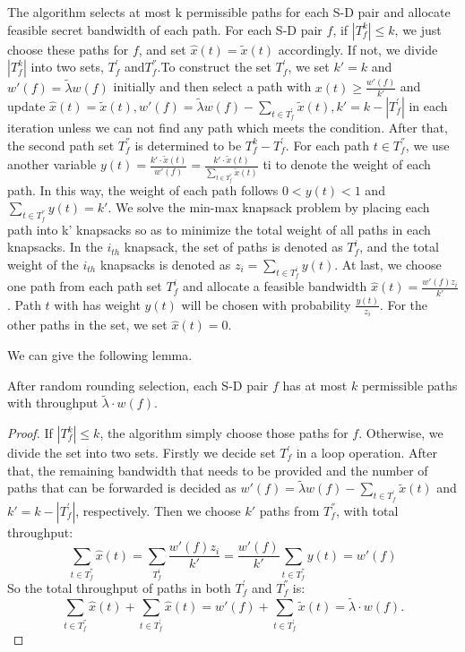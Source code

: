 {The algorithm selects at most k permissible paths  for each S-D pair and allocate feasible secret bandwidth of each path. For each S-D pair $f$, if $|T^k_f| \le k$, we just choose these paths for $f$, and set $\hat{x}(t) = \widetilde{x}(t)$ accordingly. If not, we divide $|T^k_f|$ into two sets, $T^{'}_{f}$ and$ T^{''}_{f}$.To construct the set  $T^{'}_{f}$, we set $k' = k$ and $w'(f) = \widetilde{\lambda}w(f)$ initially and then select a path with $x(t) \ge \frac{w'(f)}{k'}$ and update $\hat{x}(t) = \widetilde{x}(t), w'(f) = \widetilde{\lambda}w(f) - \sum_{t \in T^{'}_f} \widetilde{x}(t), k' = k - |T^{'}_f|$ in each iteration unless we can not find any path which meets the condition. After that, the second path set $T^{''}_{f}$ is determined to be $T^k_f - T^{'}_f$. For each path $t \in T^{''}_{f}$, we use another variable $y(t) = \frac{k' \cdot \widetilde{x}(t)}{w'(f)} = \frac{k' \cdot \widetilde{x}(t)}{\sum_{t \in T^{''}_f} \widetilde{x}(t)}$ ti to denote the weight of each path. In this way, the weight of each path  follows $0 < y(t) < 1$ and $\sum_{t \in T^{''}_f}y(t) = k'$. We solve the min-max knapsack problem by placing each path into k' knapsacks so as to minimize the total weight of all paths in each knapsacks. In the $i_{th}$ knapsack, the set of paths is denoted as $T^i_f$, and the total weight of the $i_{th}$ knapsacks is denoted as $z_i = \sum_{t \in T^i_f}y(t)$. At last, we choose one path from each path set $T^i_f$ and allocate a feasible bandwidth $\hat{x}(t) = \frac{w'(f)z_i}{k'}$. Path $t$ with has weight $y(t)$ will be chosen with probability $\frac{y(t)}{z_i}$. For the other paths in the set, we set $\hat{x}(t) = 0$.

We can give the following lemma.
\begin{lemma}
	After random rounding selection, each S-D pair $f$ has at most $k$ permissible paths with throughput $\widetilde{\lambda} \cdot w(f)$.
	
	\begin{proof}
		If $|T^k_f| \le k$, the algorithm simply choose those paths for $f$. Otherwise, we divide the set into two sets. Firstly we decide set $T^{'}_f$ in a loop operation. After that, the remaining bandwidth that needs to be provided and the number of paths that can be forwarded is decided as $w'(f) = \widetilde{\lambda}w(f) - \sum_{t \in T^{'}_f} \widetilde{x}(t)$ and $k' = k - |T^{'}_f|$, respectively. Then we choose $k'$ paths from $T^{''}_f$, with total throughput:
		\begin{equation}
		\sum_{t \in T^{''}_f} \hat{x}(t) = \sum_{T^i_f}\frac{w'(f)z_i}{k'} = \frac{w'(f)}{k'} \sum_{t \in T^{''}_f} y(t) = w'(f)
		\end{equation}
		So the total throughput of paths in both $ T^{'}_f$ and $ T^{''}_f$ is:
		\begin{equation}
		\sum_{t \in T^{''}_f} \hat{x}(t) + \sum_{t \in T^{'}_f} \hat{x}(t) = w'(f) + \sum_{t \in T^{'}_f} \widetilde{x}(t) = \widetilde{\lambda} \cdot w(f).
		\end{equation}
	\end{proof}
\end{lemma}


}
